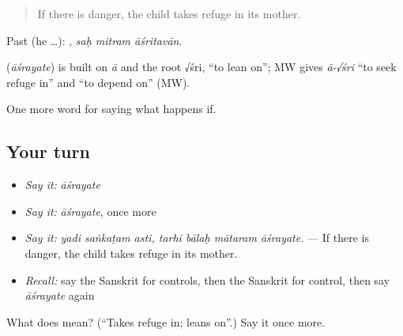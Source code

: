 \begin{quote}
If there is danger, the child takes refuge in its mother.
\end{quote}

Past (he …):   , \emph{saḥ mitram āśritavān}.

\begin{cousinweb}
\textbf{} (\emph{āśrayate}) is built on \emph{ā} and the root √śri, \textquotedblleft{}to lean on\textquotedblright{}; MW gives \emph{ā-√śri} \textquotedblleft{}to seek refuge in\textquotedblright{} and \textquotedblleft{}to depend on\textquotedblright{} (MW).
\end{cousinweb}

\begin{grammarlens}[title={What you've built}]
One more word for saying what happens if.
\end{grammarlens}

\subsection*{Your turn}
\begin{itemize}
\raggedright
  \item \emph{Say it:} \emph{āśrayate}
  \item \emph{Say it:} \emph{āśrayate}, once more
  \item \emph{Say it:} \emph{yadi saṅkaṭam asti, tarhi bālaḥ mātaram āśrayate.} — If there is danger, the child takes refuge in its mother.
  \item \emph{Recall:} say the Sanskrit for controls, then the Sanskrit for control, then say \emph{āśrayate} again
\end{itemize}

\begin{tcolorbox}[breakable,colback=teal!4,colframe=teal!35!black,title={Before you move on}]
What does  mean? (\textquotedblleft{}Takes refuge in; leans on\textquotedblright{}.) Say it once more.
\end{tcolorbox}
